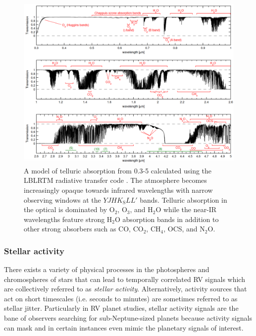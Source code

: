 \begin{figure}
  \centering
  \includegraphics[width=0.8\hsize]{figures/transmittancev2.png}
  \caption[Atmospheric transmission from 0.3-5 $\mu$m.]
          {A model of telluric absorption from 0.3-5 \micron{} calculated using the LBLRTM radiative transfer
            code \citep{clough05}. The atmosphere becomes increasingly opaque towards infrared wavelengths with
            narrow observing windows at the $YJHK_{\text{S}}LL'$ bands. Telluric absorption in the optical is
            dominated by O$_2$, O$_3$, and H$_2$O while the near-IR wavelengths feature strong H$_2$O absorption
            bands in addition to other strong absorbers such as CO, CO$_2$, CH$_4$, OCS, and N$_2$O.
            \citep[Image credit:][]{smette15}}
  \label{fig:transmission}
\end{figure}

\subsubsection{Stellar activity} \label{sect:activity}
There exists a variety of physical processes in the photospheres and chromospheres of stars that
can lead to temporally correlated RV signals which are collectively
referred to as \emph{stellar activity}. Alternatively, activity sources that act on short timescales
(i.e. seconds to minutes) are sometimes referred to as stellar jitter.
Particularly in RV planet studies, stellar activity
signals are the bane of observers searching for sub-Neptune-sized planets because activity signals
can mask and in certain instances even mimic the planetary signals of interest. \\

